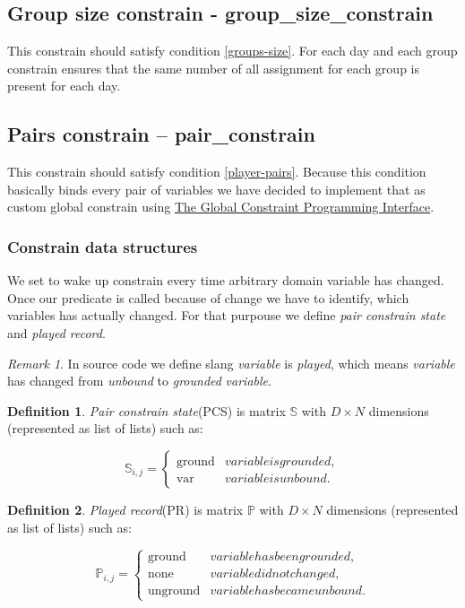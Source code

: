 \documentclass[a4paper]{article}
\theoremstyle{definition}
\newtheorem{definition}{Definition}[section]
\theoremstyle{remark}
\newtheorem*{remark}{Remark}
\newcommand{\mdef}[2]{
	\theoremstyle{definition}
	\begin{definition}{#1}
	#2
	\end{definition}
}
\newcommand{\mremark}[2]{
	\theoremstyle{remark}
	\begin{remark}{#1}
	#2
	\end{remark}
}
\newcommand{\ccc}[1]{{\mbox{\fontfamily{lmtt}\selectfont\textbf{#1}}}}
\begin{document}
\subsection{Group size constrain - \ccc{group\_size\_constrain}}
This constrain should satisfy condition \ref{groups-size}. For each day 
and each group constrain ensures that the same number of all assignment for
each group is present for each day. 

\subsection{Pairs constrain -- \ccc{pair\_constrain}}
This constrain should satisfy condition \ref{player-pairs}. Because this condition basically 
binds every pair of variables we have decided to implement that as custom global constrain
using \href{https://sicstus.sics.se/sicstus/docs/latest4/html/sicstus.html/The-Global-Constraint-Programming-Interface.html#The-Global-Constraint-Programming-Interface}{
The Global Constraint Programming Interface}. 

\subsubsection{Constrain data structures}
We set to wake up constrain every time arbitrary domain variable has changed.
Once our predicate is called because of change we have to identify, which 
variables has actually changed. For that purpouse we define
\textit{pair constrain state} and \textit{played record}.

\mremark{}{
In source code we define slang \textit{variable} is \textit{played}, 
which means \textit{variable} has changed from \textit{unbound} to \textit{grounded} \textit{variable}.
}

\mdef{}{
\textit{Pair constrain state}(PCS) is matrix $\mathbb{S}$ with $D \times N$ dimensions (represented as list of lists) such as:

\begin{equation}
	\mathbb{S}_{i,j} = 
	\begin{cases*}
		\text{ground} & variable is grounded, \\
		\text{var} & variable is unbound.
	\end{cases*}
\end{equation}
}

\mdef{}{
\textit{Played record}(PR) is matrix $\mathbb{P}$ with $D \times N$ dimensions (represented as list of lists) such as:

\begin{equation}
	\mathbb{P}_{i,j} = 
	\begin{cases*}
		\text{ground} & variable has been grounded, \\
		\text{none} & variable did not changed, \\ 
		\text{unground} & variable has became unbound .
	\end{cases*}
\end{equation}
}
\end{document}

